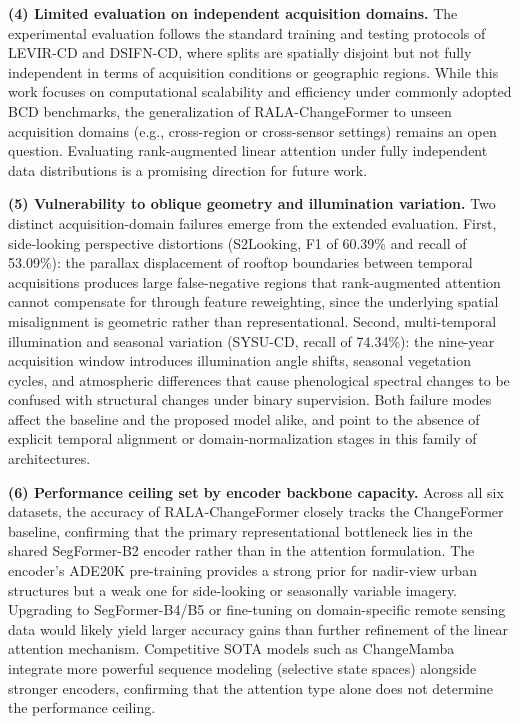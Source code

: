 \documentclass[runningheads]{llncs}
\newcommand{\journal}[1]{{\color{orange}#1}}
\begin{document}
\noindent \textbf{(4) Limited evaluation on independent acquisition domains.}
The experimental evaluation follows the standard training and testing protocols
of LEVIR-CD and DSIFN-CD, where splits are spatially disjoint but not fully
independent in terms of acquisition conditions or geographic regions. While this
work focuses on computational scalability and efficiency under commonly adopted
BCD benchmarks, the generalization of RALA-ChangeFormer to unseen acquisition
domains (e.g., cross-region or cross-sensor settings) remains an open question.
Evaluating rank-augmented linear attention under fully independent data
distributions is a promising direction for future work.

\journal{\noindent \textbf{(5) Vulnerability to oblique geometry and
illumination variation.}
Two distinct acquisition-domain failures emerge from the extended evaluation.
First, side-looking perspective distortions (S2Looking, F1 of 60.39\% and
recall of 53.09\%): the parallax displacement of rooftop boundaries between
temporal acquisitions produces large false-negative regions that rank-augmented
attention cannot compensate for through feature reweighting, since the
underlying spatial misalignment is geometric rather than representational.
Second, multi-temporal illumination and seasonal variation (SYSU-CD,
recall of 74.34\%): the nine-year acquisition window introduces illumination angle
shifts, seasonal vegetation cycles, and atmospheric differences that cause
phenological spectral changes to be confused with structural changes under
binary supervision. Both failure modes affect the baseline and the proposed
model alike, and point to the absence of explicit temporal alignment or
domain-normalization stages in this family of architectures.}

\journal{\noindent \textbf{(6) Performance ceiling set by encoder backbone
capacity.}
Across all six datasets, the accuracy of RALA-ChangeFormer closely tracks the
ChangeFormer baseline, confirming that the primary representational bottleneck
lies in the shared SegFormer-B2 encoder rather than in the attention
formulation. The encoder's ADE20K pre-training provides a strong prior for
nadir-view urban structures but a weak one for side-looking or seasonally
variable imagery. Upgrading to SegFormer-B4/B5 or fine-tuning on
domain-specific remote sensing data would likely yield larger accuracy gains
than further refinement of the linear attention mechanism.
Competitive SOTA models such as ChangeMamba~\cite{Chen2024ChangeMamba}
integrate more powerful sequence modeling (selective state spaces) alongside
stronger encoders, confirming that the attention type alone does not determine
the performance ceiling.}
\end{document}

